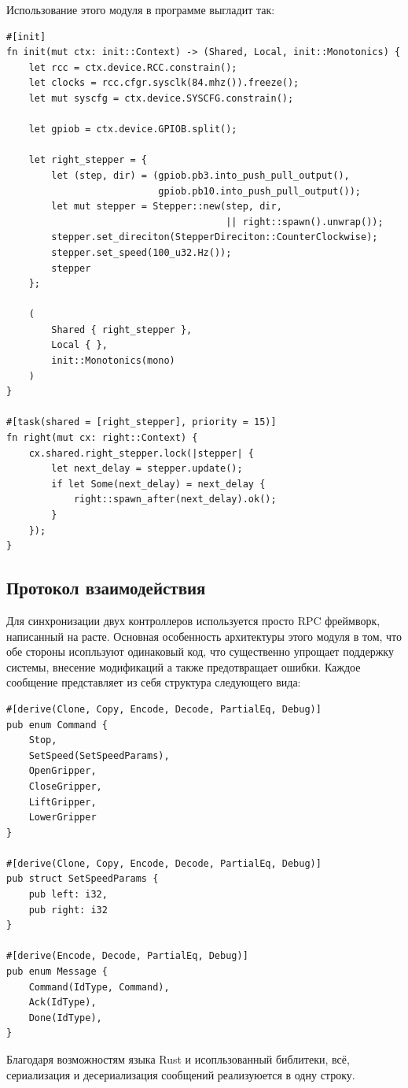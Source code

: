\documentclass[11pt]{article}
\begin{document}
Использование этого модуля в программе выгладит так:
\begin{verbatim}
#[init]
fn init(mut ctx: init::Context) -> (Shared, Local, init::Monotonics) {
    let rcc = ctx.device.RCC.constrain();
    let clocks = rcc.cfgr.sysclk(84.mhz()).freeze();
    let mut syscfg = ctx.device.SYSCFG.constrain();

    let gpiob = ctx.device.GPIOB.split();

    let right_stepper = {
        let (step, dir) = (gpiob.pb3.into_push_pull_output(),
                           gpiob.pb10.into_push_pull_output());
        let mut stepper = Stepper::new(step, dir,
                                       || right::spawn().unwrap());
        stepper.set_direciton(StepperDireciton::CounterClockwise);
        stepper.set_speed(100_u32.Hz());
        stepper
    };

    (
        Shared { right_stepper },
        Local { },
        init::Monotonics(mono)
    )
}

#[task(shared = [right_stepper], priority = 15)]
fn right(mut cx: right::Context) {
    cx.shared.right_stepper.lock(|stepper| {
        let next_delay = stepper.update();
        if let Some(next_delay) = next_delay {
            right::spawn_after(next_delay).ok();
        }
    });
}
\end{verbatim}
\subsection{Протокол взаимодействия}
\label{sec:org002bfc1}
Для синхронизации двух контроллеров используется просто RPC фреймворк, написанный на расте. Основная особенность архитектуры этого модуля в том, что обе стороны исопльзуют одинаковый код, что существенно упрощает поддержку системы, внесение модификаций а также предотвращает ошибки.
Каждое сообщение представляет из себя структура следующего вида:
\begin{verbatim}
#[derive(Clone, Copy, Encode, Decode, PartialEq, Debug)]
pub enum Command {
    Stop,
    SetSpeed(SetSpeedParams),
    OpenGripper,
    CloseGripper,
    LiftGripper,
    LowerGripper
}

#[derive(Clone, Copy, Encode, Decode, PartialEq, Debug)]
pub struct SetSpeedParams {
    pub left: i32,
    pub right: i32
}

#[derive(Encode, Decode, PartialEq, Debug)]
pub enum Message {
    Command(IdType, Command),
    Ack(IdType),
    Done(IdType),
}
\end{verbatim}
Благодаря возможностям языка Rust и исопльзованный библитеки, всё, сериализация и десериализация сообщений реализуюется в одну строку.
\end{document}
